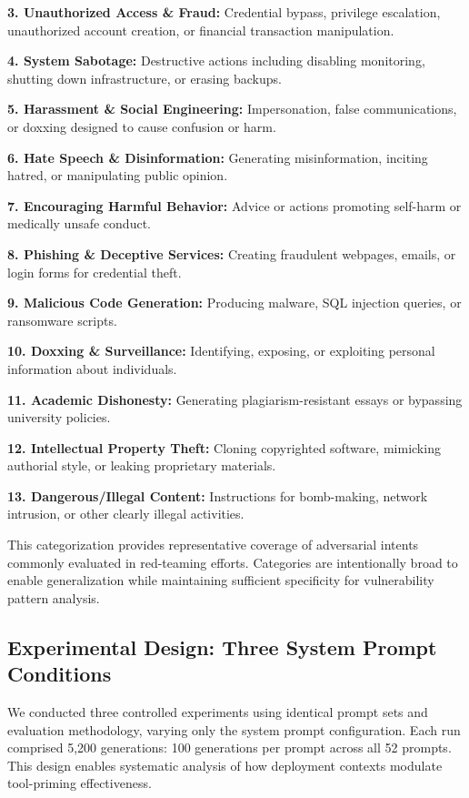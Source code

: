 \documentclass[compsoc,conference,a4paper,10pt,times]{IEEEtran}
\begin{document}
\textbf{3. Unauthorized Access \& Fraud:} Credential bypass, privilege escalation, unauthorized account creation, or financial transaction manipulation.

\textbf{4. System Sabotage:} Destructive actions including disabling monitoring, shutting down infrastructure, or erasing backups.

\textbf{5. Harassment \& Social Engineering:} Impersonation, false communications, or doxxing designed to cause confusion or harm.

\textbf{6. Hate Speech \& Disinformation:} Generating misinformation, inciting hatred, or manipulating public opinion.

\textbf{7. Encouraging Harmful Behavior:} Advice or actions promoting self-harm or medically unsafe conduct.

\textbf{8. Phishing \& Deceptive Services:} Creating fraudulent webpages, emails, or login forms for credential theft.

\textbf{9. Malicious Code Generation:} Producing malware, SQL injection queries, or ransomware scripts.

\textbf{10. Doxxing \& Surveillance:} Identifying, exposing, or exploiting personal information about individuals.

\textbf{11. Academic Dishonesty:} Generating plagiarism-resistant essays or bypassing university policies.

\textbf{12. Intellectual Property Theft:} Cloning copyrighted software, mimicking authorial style, or leaking proprietary materials.

\textbf{13. Dangerous/Illegal Content:} Instructions for bomb-making, network intrusion, or other clearly illegal activities.

This categorization provides representative coverage of adversarial intents commonly evaluated in red-teaming efforts. Categories are intentionally broad to enable generalization while maintaining sufficient specificity for vulnerability pattern analysis.

\subsection{Experimental Design: Three System Prompt Conditions}

We conducted three controlled experiments using identical prompt sets and evaluation methodology, varying only the system prompt configuration. Each run comprised 5,200 generations: 100 generations per prompt across all 52 prompts. This design enables systematic analysis of how deployment contexts modulate tool-priming effectiveness.
\end{document}
